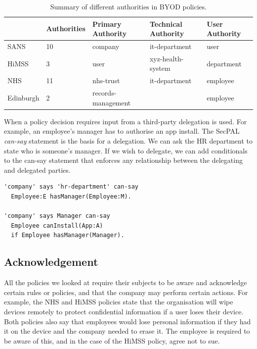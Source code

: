 \documentclass[thesis.tex]{subfiles}
\begin{document}
\begin{table}\centering\footnotesize\sffamily
  \begin{tabular}{lllll}
    \toprule
              & Authorities & Primary Authority  & Technical Authority & User Authority \\
    \midrule
    SANS      & 10          & company            & it-department       & user           \\
    HiMSS     & 3           & user               & xyz-health-system   & department     \\
    NHS       & 11          & nhs-trust          & it-department       & employee       \\
    Edinburgh & 2           & records-management &                     & employee       \\
    \bottomrule
  \end{tabular}
  \caption{Summary of different authorities in BYOD policies.}
  \label{tab:principals}
\end{table}

When a policy decision requires input from a third-party delegation is used.
For example, an employee's manager has to authorise an app install.
The SecPAL \emph{can-say} statement is the basis for a delegation.
We can ask the HR department to state who is someone's manager.
If we wish to delegate, we can add conditionals to the can-say
statement that enforces any relationship between the delegating and
delegated parties.

\begin{lstlisting}
'company' says 'hr-department' can-say
  Employee:E hasManager(Employee:M).

'company' says Manager can-say
  Employee canInstall(App:A)
  if Employee hasManager(Manager).
\end{lstlisting}

\subsection{Acknowledgement}

All the policies we looked at require their subjects to be aware and
acknowledge certain rules or policies, and that the company may
perform certain actions.  For example, the NHS and \ac{HiMSS} policies
state that the organisation will wipe devices remotely to protect
confidential information if a user loses their device.  Both policies
also say that employees would lose personal information if they had it
on the device and the company needed to erase it.  The employee is
required to be aware of this, and in the case of the \ac{HiMSS}
policy, agree not to sue.
\end{document}
